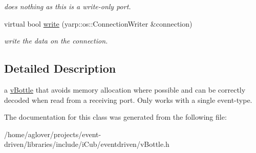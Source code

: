 \begin{DoxyCompactItemize}
\begin{DoxyCompactList}\small\item\em does nothing as this is a write-\/only port. \end{DoxyCompactList}\item 
virtual bool \hyperlink{classev_1_1vBottleMimic_a39ad9b924890d8f8f717f49b6c5ad23f}{write} (yarp\+::os\+::\+Connection\+Writer \&connection)\hypertarget{classev_1_1vBottleMimic_a39ad9b924890d8f8f717f49b6c5ad23f}{}\label{classev_1_1vBottleMimic_a39ad9b924890d8f8f717f49b6c5ad23f}

\begin{DoxyCompactList}\small\item\em write the data on the connection. \end{DoxyCompactList}\end{DoxyCompactItemize}


\subsection{Detailed Description}
a \hyperlink{classev_1_1vBottle}{v\+Bottle} that avoids memory allocation where possible and can be correctly decoded when read from a receiving port. Only works with a single event-\/type. 

The documentation for this class was generated from the following file\+:\begin{DoxyCompactItemize}
\item 
/home/aglover/projects/event-\/driven/libraries/include/i\+Cub/eventdriven/v\+Bottle.\+h\end{DoxyCompactItemize}
